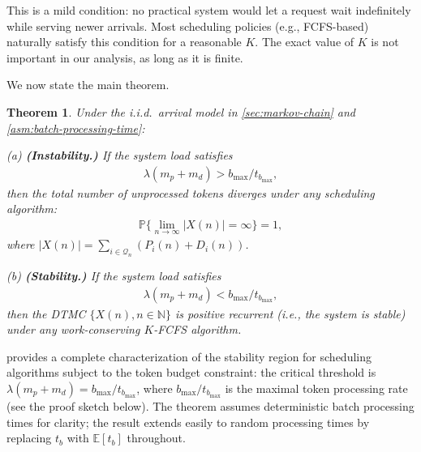 \documentclass[11pt]{article}
\theoremstyle{plain}
\newtheorem{theorem}{Theorem}
\theoremstyle{definition}
\theoremstyle{remark}
\newcommand{\E}{\mathbb{E}}
\newcommand{\N}{\mathbb{N}}
\newcommand{\Prob}{\mathbb{P}}
\providecommand{\abs}[1]{\lvert#1\rvert}
\begin{document}
This is a mild condition: no practical system would let a request wait indefinitely while serving newer arrivals. Most scheduling policies (e.g., FCFS-based) naturally satisfy this condition for a reasonable $K$. The exact value of $K$ is not important in our analysis, as long as it is finite.

We now state the main theorem.
\begin{theorem}\label{thm:main}
  Under the i.i.d.\ arrival model in \cref{sec:markov-chain} and \cref{asm:batch-processing-time}:

\noindent (a) \textbf{(Instability.)} If the system load satisfies
   \begin{align}\label{eq:load>}
  \lambda (m_p+m_d) > b_{\max} / t_{b_{\max}},
   \end{align}
then the total number of unprocessed tokens diverges under \emph{any} scheduling algorithm:
   \begin{align}
     \label{eq:diverge}
     \Prob\{ \lim_{n\to \infty} \abs{X(n)} =\infty\}=1,
   \end{align}
   where $\abs{X(n)}=\sum_{i\in \mathcal{Q}_n}(P_i(n)+D_i(n))$.

\noindent (b) \textbf{(Stability.)} If the system load satisfies
  \begin{align}\label{eq:load<}
  \lambda (m_p+m_d) < b_{\max} / t_{b_{\max}},
\end{align}
then the DTMC $\{X(n), n\in \N\}$ is positive recurrent (i.e., the system is stable) under any work-conserving $K$-FCFS algorithm.
\end{theorem}

 provides a complete characterization of the stability region for scheduling algorithms subject to the token budget constraint: the critical threshold is $\lambda(m_p+m_d) = b_{\max}/t_{b_{\max}}$, where $b_{\max}/t_{b_{\max}}$ is the maximal token processing rate (see the proof sketch below). The theorem assumes deterministic batch processing times for clarity; the result extends easily to random processing times by replacing $t_b$ with $\E[t_b]$ throughout.
\end{document}
